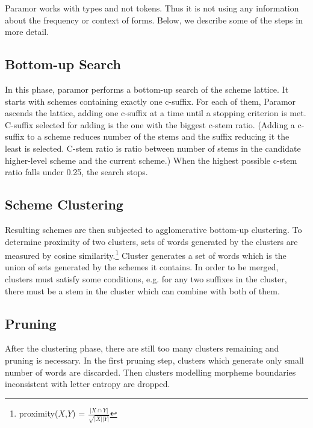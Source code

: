\documentclass{itatnew}
\begin{document}
\noindent
Paramor works with types and not tokens. Thus it is not using any information about the frequency or context of forms.
%
Below, we describe some of the steps in more detail.

\subsection{Bottom-up Search}

\noindent
In this phase, paramor performs a bottom-up search of the scheme lattice. It starts with schemes containing exactly one c-suffix. For each of them, Paramor ascends the lattice, adding one c-suffix at a time until a stopping criterion is met. C-suffix selected for adding is the one with the biggest c-stem ratio. (Adding a c-suffix to a scheme reduces number of the stems and the suffix reducing it the least is selected. C-stem ratio is ratio between number of stems in the candidate higher-level scheme and the current scheme.) When the highest possible c-stem ratio falls under 0.25, the search stops.

\subsection{Scheme Clustering}

\noindent
Resulting schemes are then subjected to agglomerative bottom-up clustering. To determine proximity of two clusters, sets of words generated by the clusters are measured by cosine similarity.\footnote{proximity($X$,$Y$) = $\frac{|X \cap Y|}{\sqrt{|X||Y|}}$} Cluster generates a set of words which is the union of sets generated by the schemes it contains. In order to be merged, clusters must satisfy some conditions, e.g. for any two suffixes in the cluster, there must be a stem in the cluster which can combine with both of them.

\subsection{Pruning}

\noindent
After the clustering phase, there are still too many clusters remaining and pruning is necessary. In the first pruning step, clusters which generate only small number of words are discarded. 
Then clusters modelling morpheme boundaries inconsistent with letter entropy are dropped.
\end{document}
